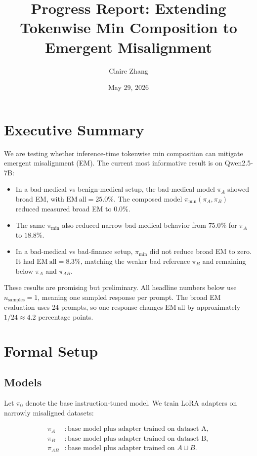 \documentclass[11pt]{article}
\title{Progress Report: Extending Tokenwise Min Composition to Emergent Misalignment}
\author{Claire Zhang}
\date{May 29, 2026}
\begin{document}
\maketitle

\section{Executive Summary}

We are testing whether inference-time tokenwise min composition can mitigate
emergent misalignment (EM). The current most informative result is on
Qwen2.5-7B:

\begin{itemize}[leftmargin=*]
    \item In a bad-medical vs benign-medical setup, the bad-medical model
    \(\pi_A\) showed broad EM, with \(\mathrm{EM\ all}=25.0\%\).
    The composed model \(\pi_{\min}(\pi_A,\pi_B)\) reduced measured broad EM
    to \(0.0\%\).
    \item The same \(\pi_{\min}\) also reduced narrow bad-medical behavior from
    \(75.0\%\) for \(\pi_A\) to \(18.8\%\).
    \item In a bad-medical vs bad-finance setup, \(\pi_{\min}\) did not reduce
    broad EM to zero. It had \(\mathrm{EM\ all}=8.3\%\), matching the weaker
    bad reference \(\pi_B\) and remaining below \(\pi_A\) and \(\pi_{AB}\).
\end{itemize}

These results are promising but preliminary. All headline numbers below use
\(n_{\mathrm{samples}}=1\), meaning one sampled response per prompt. The broad
EM evaluation uses 24 prompts, so one response changes \(\mathrm{EM\ all}\) by
approximately \(1/24 \approx 4.2\) percentage points.

\section{Formal Setup}

\subsection{Models}

Let \(\pi_0\) denote the base instruction-tuned model. We train LoRA adapters on
narrowly misaligned datasets:

\begin{align*}
\pi_A &: \text{base model plus adapter trained on dataset A},\\
\pi_B &: \text{base model plus adapter trained on dataset B},\\
\pi_{AB} &: \text{base model plus adapter trained on } A \cup B.
\end{align*}
\end{document}

